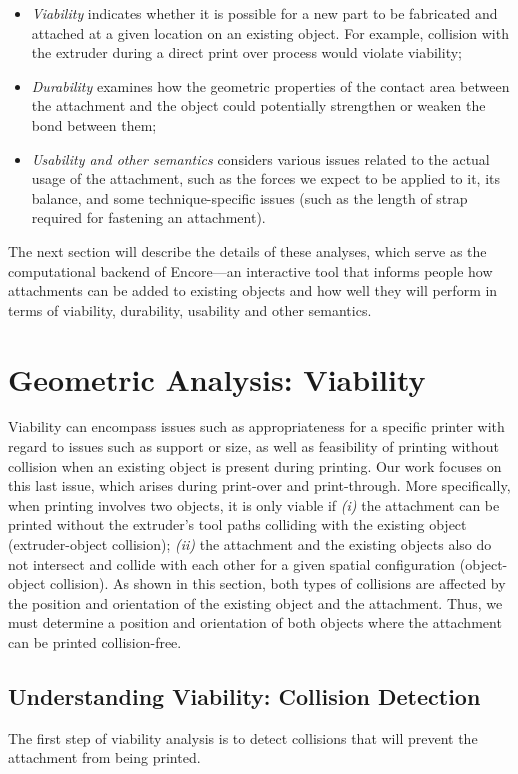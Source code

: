 \begin{itemize}
	\item \textit{Viability} indicates whether it is possible for a new part to be fabricated and attached at a given location on an existing object. For example, collision with the extruder during a direct print over process would violate viability;
	\item \textit{Durability} examines how the geometric properties of the contact area between the attachment and the object could potentially strengthen or weaken the bond between them;
	\item \textit{Usability and other semantics} considers various issues related to the actual usage of the attachment, such as the forces we expect to be applied to it, its balance, and some technique-specific issues (such as the length of strap required for fastening an attachment).
\end{itemize}

The next section will describe the details of these analyses, which serve as the computational backend of Encore---an interactive tool that informs people how attachments can be added to existing objects and how well they will perform in terms of viability, durability, usability and other semantics.


\section{Geometric Analysis: Viability}
Viability can encompass issues such as appropriateness for a specific printer with regard to issues such as support or size, as well as feasibility of printing without collision when an existing object is present during printing. Our work focuses on this last issue, which arises during print-over and print-through.
More specifically, when printing involves two objects, it is only viable if {\em (i)} the attachment can be printed without the extruder's tool paths colliding with the existing object (extruder-object collision); {\em (ii)} the attachment and the existing objects also do not intersect and collide with each other for a given spatial configuration (object-object collision). As shown in this section, both types of collisions are affected by the position and orientation of the existing object and the attachment. Thus, we must determine a position and orientation of both objects where the attachment can be printed collision-free.

\subsection{Understanding Viability: Collision Detection}
The first step of viability analysis is to detect collisions that will prevent the attachment from being printed.

